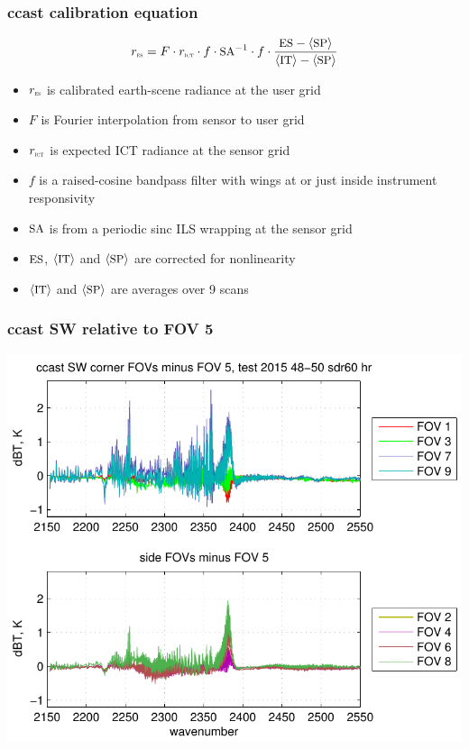 \documentclass[11pt]{beamer}
\begin{document}
\begin{frame}
\frametitle{ccast calibration equation}

\[r_{\mbox{\tiny\textsc{es}}} = F \cdot r_{\mbox{\tiny\textsc{ict}}} \cdot f \cdot \mbox{\small SA}^{-1}\cdot f \cdot 
         \frac{\mbox{\small ES} - \langle\mbox{\small SP}\rangle}{\langle\mbox{\small IT}\rangle - \langle\mbox{\small SP}\rangle} \]

\begin{itemize}
  \item $r_{\mbox{\tiny\textsc{es}}}$ is calibrated earth-scene radiance at the user grid
  \item $F$ is Fourier interpolation from sensor to user grid
  \item $r_{\mbox{\tiny\textsc{ict}}}$ is expected ICT radiance at the sensor grid
  \item $f$ is a raised-cosine bandpass filter with wings at or just
    inside instrument responsivity
  \item $\mbox{\small SA}$ is from a periodic sinc ILS wrapping at the sensor
    grid
  \item $\mbox{\small ES}$, $\langle\mbox{\small IT}\rangle$ and $\langle\mbox{\small SP}\rangle$ are corrected for
    nonlinearity
  \item $\langle\mbox{\small IT}\rangle$ and $\langle\mbox{\small SP}\rangle$ are averages over 9 scans
\end{itemize}

\end{frame}
\begin{frame}
\frametitle{ccast SW relative to FOV 5}
\begin{center}
  \includegraphics[scale=0.7]{figures/ccast_SW_dif_2015_48-50_sdr60_hr.pdf}
\end{center}
\end{frame}
\end{document}
